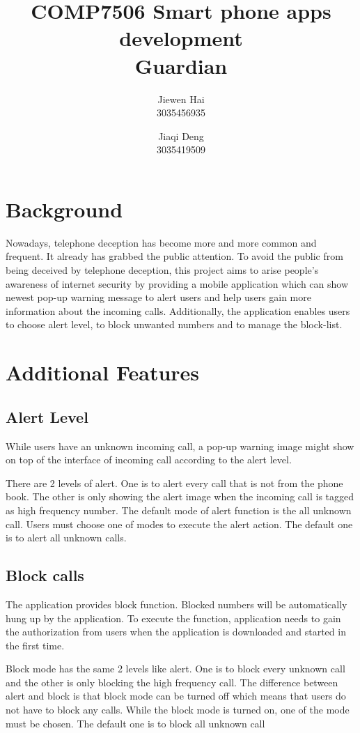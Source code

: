 \documentclass{article}
\author{
    Jiewen Hai\\
    3035456935
    \and
    Jiaqi Deng\\
    3035419509
}
\title{COMP7506 Smart phone apps development\\Guardian}
\date{}
\begin{document}
 
\maketitle

\setcounter{tocdepth}{2}
\tableofcontents

\section{Background}
Nowadays, telephone deception has become more and more common and frequent. It already has grabbed the public attention. To avoid the public from being deceived by telephone deception, this project aims to arise people’s awareness of internet security by providing a mobile application which can show newest pop-up warning message to alert users and help users gain more information about the incoming calls. Additionally, the application enables users to choose alert level, to block unwanted numbers and to manage the block-list.

\section{Additional Features}
\subsection{Alert Level}
While users have an unknown incoming call, a pop-up warning image might show on top of the interface of incoming call according to the alert level.

There are 2 levels of alert. One is to alert every call that is not from the phone book. The other is only showing the alert image when the incoming call is tagged as high frequency number. The default mode of alert function is the all unknown call. Users must choose one of modes to execute the alert action. The default one is to alert all unknown calls.

\subsection{Block calls}
The application provides block function. Blocked numbers will be automatically hung up by the application. To execute the function, application needs to gain the authorization from users when the application is downloaded and started in the first time.

Block mode has the same 2 levels like alert. One is to block every unknown call and the other is only blocking the high frequency call. The difference between alert and block is that block mode can be turned off which means that users do not have to block any calls. While the block mode is turned on, one of the mode must be chosen. The default one is to block all unknown call
\end{document}
